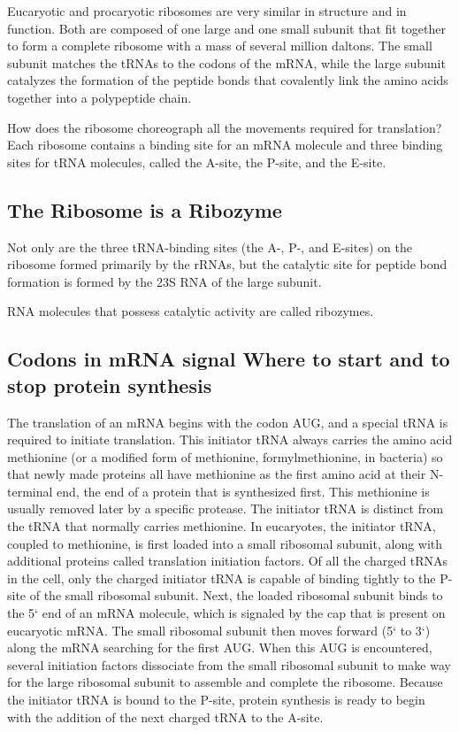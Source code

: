 Eucaryotic and procaryotic ribosomes are very similar in structure and
in function. Both are composed of one large and one small subunit that
fit together to form a complete ribosome with a mass of several million daltons.
The small subunit matches the tRNAs to
the codons of the mRNA, while the large subunit catalyzes the formation
of the peptide bonds that covalently link the amino acids together
into a polypeptide chain.

How does the ribosome choreograph all the movements required for
translation? Each ribosome contains a binding site for an mRNA molecule
and three binding sites for tRNA molecules, called the A-site, the
P-site, and the E-site.

\subsection{The Ribosome is a Ribozyme}

Not only are the three tRNA-binding sites (the A-, P-, and E-sites) on the
ribosome formed primarily by the rRNAs, but the catalytic site for peptide
bond formation is formed by the 23S RNA of the large subunit.

RNA molecules that possess catalytic activity are called ribozymes.

\subsection{Codons in mRNA signal Where to start and to stop protein synthesis}

The translation of an mRNA begins with the codon AUG, and a special
tRNA is required to initiate translation. This initiator tRNA always carries
the amino acid methionine (or a modified form of methionine, formylmethionine,
in bacteria) so that newly made proteins all have methionine
as the first amino acid at their N-terminal end, the end of a protein that
is synthesized first. This methionine is usually removed later by a specific
protease. The initiator tRNA is distinct from the tRNA that normally carries methionine.
In eucaryotes, the initiator tRNA, coupled to methionine, is first loaded into
a small ribosomal subunit, along with additional proteins called translation
initiation factors. Of all the charged tRNAs in the cell,
only the charged initiator tRNA is capable of binding tightly to the P-site
of the small ribosomal subunit. Next, the loaded ribosomal subunit binds
to the 5` end of an mRNA molecule, which is signaled by the cap that is
present on eucaryotic mRNA. The small ribosomal subunit then moves forward
(5` to 3`) along the mRNA searching for the first
AUG. When this AUG is encountered, several initiation factors dissociate
from the small ribosomal subunit to make way for the large ribosomal
subunit to assemble and complete the ribosome. Because the initiator
tRNA is bound to the P-site, protein synthesis is ready to begin with the
addition of the next charged tRNA to the A-site.

